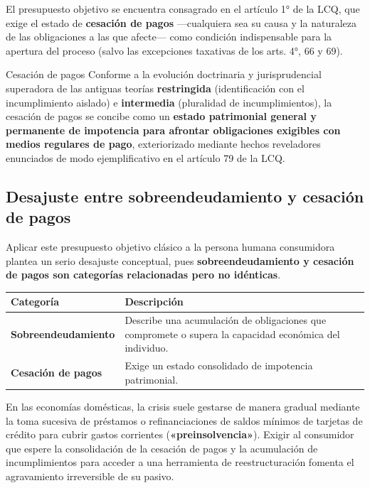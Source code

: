 \documentclass[12pt,oneside]{book}
\begin{document}
El presupuesto objetivo se encuentra consagrado en el artículo 1° de la LCQ, que exige el estado de \textbf{cesación de pagos} ---cualquiera sea su causa y la naturaleza de las obligaciones a las que afecte--- como condición indispensable para la apertura del proceso (salvo las excepciones taxativas de los arts. 4°, 66 y 69).

\begin{definition}{Cesación de pagos}
Conforme a la evolución doctrinaria y jurisprudencial superadora de las antiguas teorías \textbf{restringida} (identificación con el incumplimiento aislado) e \textbf{intermedia} (pluralidad de incumplimientos), la cesación de pagos se concibe como un \textbf{estado patrimonial general y permanente de impotencia para afrontar obligaciones exigibles con medios regulares de pago}, exteriorizado mediante hechos reveladores enunciados de modo ejemplificativo en el artículo 79 de la LCQ.
\end{definition}

\subsection{Desajuste entre sobreendeudamiento y cesación de pagos}

Aplicar este presupuesto objetivo clásico a la persona humana consumidora plantea un serio desajuste conceptual, pues \textbf{sobreendeudamiento y cesación de pagos son categorías relacionadas pero no idénticas}.

\begin{table}[H]
\centering
\small
\begin{tabularx}{\textwidth}{>{\raggedright\arraybackslash}p{}>{\raggedright\arraybackslash}X}
\toprule
\textbf{Categoría} & \textbf{Descripción} \\
\midrule
\textbf{Sobreendeudamiento} & Describe una acumulación de obligaciones que compromete o supera la capacidad económica del individuo. \\
\addlinespace
\textbf{Cesación de pagos} & Exige un estado consolidado de impotencia patrimonial. \\
\bottomrule
\end{tabularx}
\end{table}

En las economías domésticas, la crisis suele gestarse de manera gradual mediante la toma sucesiva de préstamos o refinanciaciones de saldos mínimos de tarjetas de crédito para cubrir gastos corrientes (\textbf{«preinsolvencia»}). Exigir al consumidor que espere la consolidación de la cesación de pagos y la acumulación de incumplimientos para acceder a una herramienta de reestructuración fomenta el agravamiento irreversible de su pasivo.
\end{document}
